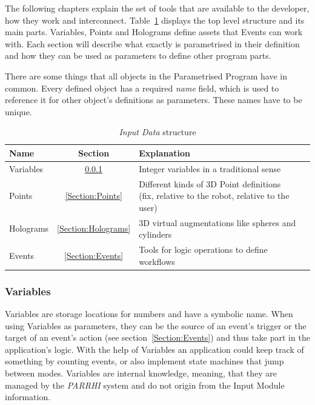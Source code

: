 The following chapters explain the set of tools that are available to the developer, how they work and interconnect. Table~\ref{Table:InputDataStructure} displays the top level structure and its main parts. Variables, Points and Holograms define assets that Events can work with. Each section will describe what exactly is parametrised in their definition and how they can be used as parameters to define other program parts.

There are some things that all objects in the Parametrised Program have in common. Every defined object has a required \textit{name} field, which is used to reference it for other object's definitions as parameters. These names have to be unique.

\begin{table}[ht]
	\caption{\textit{Input Data} structure}
	\label{Table:InputDataStructure}
	\centering
	\begin{tabular}{lcl}
		\toprule
		Name & Section		& Explanation	\\		
		\midrule
		Variables & \ref{Section:Variables}		& Integer variables in a traditional sense \\
		Points& \ref{Section:Points}		& \parbox[t]{10cm}{Different kinds of 3D Point definitions\\(fix, relative to the robot, relative to the user)} 	 \\
		Holograms& \ref{Section:Holograms} & 3D virtual augmentations like spheres and cylinders\\
		Events& \ref{Section:Events} & Tools for logic operations to define workflows \\
		\bottomrule
	\end{tabular}
\end{table}

\subsubsection{Variables}\label{Section:Variables}
Variables are storage locations for numbers and have a symbolic name. When using Variables as parameters, they can be the source of an event's trigger or the target of an event's action (see section~\ref{Section:Events}) and thus take part in the application's logic. With the help of Variables an application could keep track of something by counting events, or also implement state machines that jump between modes. Variables are internal knowledge, meaning, that they are managed by the \textit{PARRHI} system and do not origin from the Input Module information.

